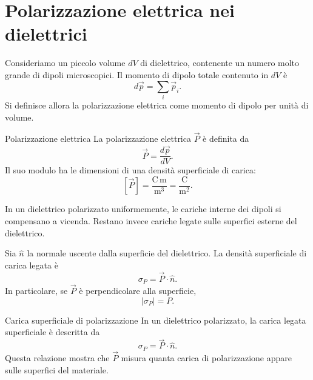 \documentclass[a4paper]{article}
\begin{document}
\section{Polarizzazione elettrica nei dielettrici}

Consideriamo un piccolo volume \(dV\) di dielettrico, contenente un numero molto grande di dipoli microscopici. Il momento di dipolo totale contenuto in \(dV\) è
\[
    d\vec{p}=\sum_i \vec{p}_i.
\]
Si definisce allora la polarizzazione elettrica come momento di dipolo per unità di volume.

\begin{snippetdefinition}{Polarizzazione elettrica}
    La polarizzazione elettrica \(\vec{P}\) è definita da
    \[
        \vec{P}=\frac{d\vec{p}}{dV}.
    \]
    Il suo modulo ha le dimensioni di una densità superficiale di carica:
    \[
        [\vec{P}]=\frac{\mathrm{C}\,\mathrm{m}}{\mathrm{m}^3}=\frac{\mathrm{C}}{\mathrm{m}^2}.
    \]
\end{snippetdefinition}

In un dielettrico polarizzato uniformemente, le cariche interne dei dipoli si compensano a vicenda. Restano invece cariche legate sulle superfici esterne del dielettrico.

\begin{center}
\end{center}

Sia \(\hat{n}\) la normale uscente dalla superficie del dielettrico. La densità superficiale di carica legata è
\[
    \sigma_P=\vec{P}\cdot\hat{n}.
\]
In particolare, se \(\vec{P}\) è perpendicolare alla superficie,
\[
    |\sigma_P|=P.
\]

\begin{snippetproposition}{Carica superficiale di polarizzazione}
    In un dielettrico polarizzato, la carica legata superficiale è descritta da
    \[
        \sigma_P=\vec{P}\cdot\hat{n}.
    \]
    Questa relazione mostra che \(\vec{P}\) misura quanta carica di polarizzazione appare sulle superfici del materiale.
\end{snippetproposition}
\end{document}
